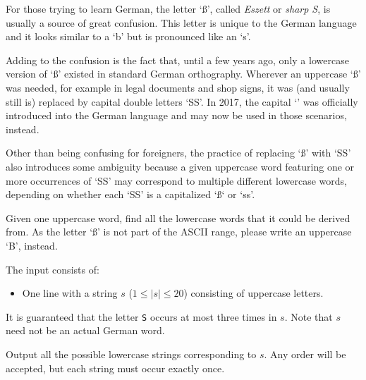 %
For those trying to learn German, the letter `ß', called \emph{Eszett} or \emph{sharp S},
is usually a source of great confusion.
This letter is unique to the German language and it looks similar to a `b' but is pronounced like an `s'.

Adding to the confusion is the fact that, until a few years ago, only a lowercase version of `ß' existed in standard German orthography.
Wherever an uppercase `ß' was needed, for example in legal documents and shop signs,
it was (and usually still is) replaced by capital double letters `SS'.
In 2017, the capital `' was officially introduced into
the German language and may now be used in those scenarios, instead.

Other than being confusing for foreigners, the practice of replacing `ß' with
`SS' also introduces some ambiguity because a given uppercase word
featuring one or more occurrences of `SS' may correspond to multiple different
lowercase words, depending on whether each `SS' is a capitalized `ß` or `ss'.

Given one uppercase word, find all the lowercase words
that it could be derived from.
As the letter `ß' is not part of the ASCII range,
please write an uppercase `B', instead.

\begin{Input}
  The input consists of:
  \begin{itemize}
    \item One line with a string $s$ ($1 \le |s| \le 20$) consisting of uppercase letters.
  \end{itemize}
  It is guaranteed that the letter \texttt{S} occurs at most three times in $s$.
  Note that $s$ need not be an actual German word.
\end{Input}

\begin{Output}
  Output all the possible lowercase strings corresponding to $s$. Any order
  will be accepted, but each string must occur exactly once.
\end{Output}
